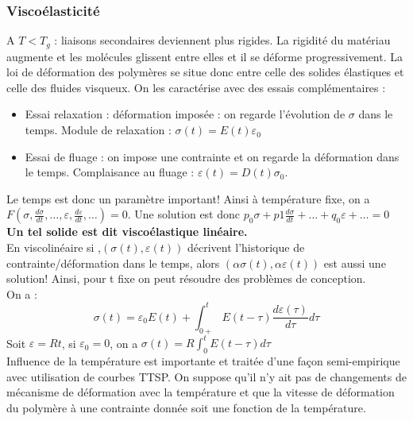 \documentclass[../main.tex]{subfiles}
\begin{document}
\subsubsection{Viscoélasticité}
A $T < T_g$ : liaisons secondaires deviennent plus rigides. La rigidité du matériau augmente et les molécules glissent entre elles et il se déforme progressivement. La loi de déformation des polymères se situe donc entre celle des solides élastiques et celle des fluides visqueux. On les caractérise avec des essais complémentaires :\\
\begin{itemize}
    \item Essai relaxation : déformation imposée : on regarde l'évolution de $\sigma$ dans le temps. Module de relaxation : $\sigma(t) = E(t) \varepsilon_0$\\
    \item Essai de fluage : on impose une contrainte et on regarde la déformation dans le temps. Complaisance au fluage : $\varepsilon(t) = D(t) \sigma_0$.\\
\end{itemize}
Le temps est donc un paramètre important! Ainsi à température fixe, on a $F(\sigma, \frac{d\sigma}{dt}, \dots, \varepsilon, \frac{d\varepsilon}{dt}, \dots) = 0$. Une solution est donc $p_0 \sigma + p1 \frac{d\sigma}{dt}+\dots+q_0 \varepsilon + \dots = 0$\\
\textbf{Un tel solide est dit viscoélastique linéaire.}\\
En viscolinéaire si ,$(\sigma(t), \varepsilon(t))$ décrivent l'historique de contrainte/déformation dans le temps, alors $(\alpha \sigma(t), \alpha \varepsilon(t))$ est aussi une solution! Ainsi, pour t fixe on peut résoudre des problèmes de conception. \\
On a : \\
\begin{equation}
    \sigma(t) = \varepsilon_0 E(t) + \int_{0+}^t E(t-\tau) \frac{d \varepsilon(\tau)}{d\tau} d\tau
\end{equation}
Soit $\varepsilon = Rt$, si $\varepsilon_0 = 0$, on a $\sigma(t) = R\int_0^t E(t-\tau)d\tau$\\

Influence de la température est importante et traitée d'une façon semi-empirique avec utilisation de courbes TTSP. On suppose qu'il n'y ait pas de changements de mécanisme de déformation avec la température et que la vitesse de déformation du polymère à une contrainte donnée soit une fonction de la température.\\
\end{document}
